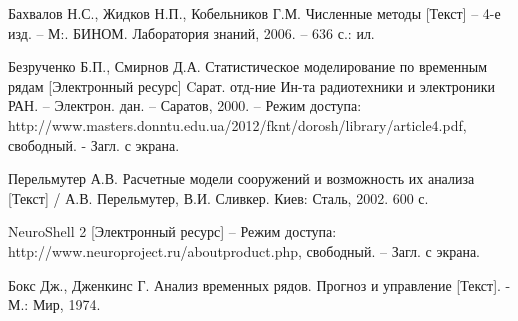 \newpage


\begin{references}
	\item\label{ref:num-methods} Бахвалов Н.С., Жидков Н.П., Кобельников Г.М.
	Численные методы [Текст] – 4-е изд. – М:. БИНОМ. Лаборатория
	знаний, 2006. – 636 с.: ил.
	\item Безрученко Б.П., Смирнов Д.А.
	Статистическое моделирование по временным рядам [Электронный ресурс]
	Cарат. отд-ние Ин-та радиотехники и электроники РАН.
	– Электрон. дан. – Саратов, 2000. – Режим доступа:
	http://www.masters.donntu.edu.ua/2012/fknt/dorosh/library/article4.pdf,
	свободный. - Загл. с экрана.
	\item Перельмутер А.В. Расчетные модели сооружений и возможность их анализа [Текст] / А.В. Перельмутер, В.И.
	Сливкер. Киев: Сталь, 2002. 600 с.
	\item NeuroShell 2 [Электронный ресурс] – Режим доступа: http://www.neuroproject.ru/aboutproduct.php, свободный. –
	Загл. с экрана.
	\item\label{ref:time-series-analysis} Бокс Дж., Дженкинс Г. Анализ временных рядов.
	Прогноз и управление [Текст]. - М.: Мир, 1974.

	\label{ref:total}
\end{references}
